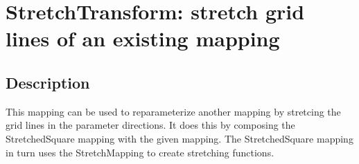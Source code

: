 \section{StretchTransform: stretch grid lines of an existing mapping}

\subsection{Description}

This mapping can be used to reparameterize another mapping by stretcing
the grid lines in the parameter directions. It does this by composing
the {\ff StretchedSquare} mapping with the given mapping. The {\ff StretchedSquare}
mapping in turn uses the {\ff StretchMapping} to create stretching functions.



% 
% 
% 
% 
% 
% 
